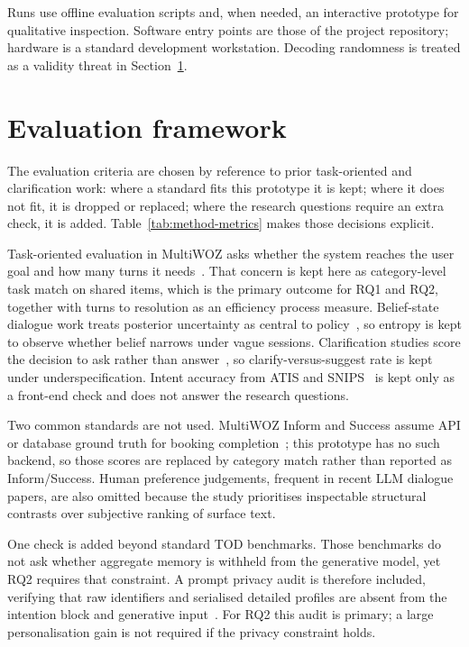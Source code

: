 Runs use offline evaluation scripts and, when needed, an interactive prototype for qualitative inspection.
Software entry points are those of the project repository; hardware is a standard development workstation.
Decoding randomness is treated as a validity threat in Section~\ref{sec:method-evaluation}.

\section{Evaluation framework}
\label{sec:method-evaluation}

The evaluation criteria are chosen by reference to prior task-oriented and clarification work: where a standard fits this prototype it is kept; where it does not fit, it is dropped or replaced; where the research questions require an extra check, it is added.
Table~\ref{tab:method-metrics} makes those decisions explicit.

Task-oriented evaluation in MultiWOZ asks whether the system reaches the user goal and how many turns it needs~\cite{budzianowski_multiwoz_2018}.
That concern is kept here as category-level task match on shared items, which is the primary outcome for RQ1 and RQ2, together with turns to resolution as an efficiency process measure.
Belief-state dialogue work treats posterior uncertainty as central to policy~\cite{young_pomdp_2013}, so entropy is kept to observe whether belief narrows under vague sessions.
Clarification studies score the decision to ask rather than answer~\cite{aliannejadi_clarifying_2019,lin_ask-to-clarify_2025}, so clarify-versus-suggest rate is kept under underspecification.
Intent accuracy from ATIS and SNIPS~\cite{hemphill-etal-1990-atis,coucke_snips_2018} is kept only as a front-end check and does not answer the research questions.

Two common standards are not used.
MultiWOZ Inform and Success assume API or database ground truth for booking completion~\cite{budzianowski_multiwoz_2018}; this prototype has no such backend, so those scores are replaced by category match rather than reported as Inform/Success.
Human preference judgements, frequent in recent LLM dialogue papers, are also omitted because the study prioritises inspectable structural contrasts over subjective ranking of surface text.

One check is added beyond standard TOD benchmarks.
Those benchmarks do not ask whether aggregate memory is withheld from the generative model, yet RQ2 requires that constraint.
A prompt privacy audit is therefore included, verifying that raw identifiers and serialised detailed profiles are absent from the intention block and generative input~\cite{staufer_name_audit_2026}.
For RQ2 this audit is primary; a large personalisation gain is not required if the privacy constraint holds.

